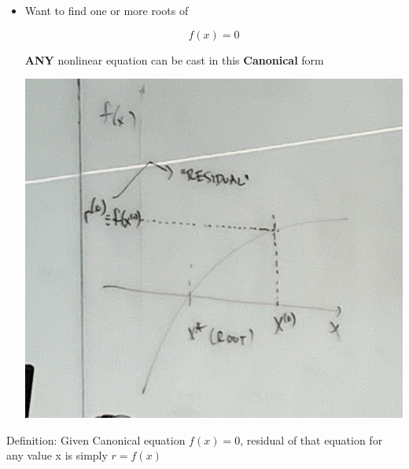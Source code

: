 \begin{itemize}
    \item Want to find one or more roots of 

    \begin{equation}
        f(x) = 0
    \end{equation}

    \textbf{ANY} nonlinear equation can be cast in this \textbf{Canonical} form

    \includegraphics[width = \linewidth]{Images/410Notes_Residual.png}
    
\end{itemize}

Definition: Given Canonical equation $f(x)=0$, residual of that equation for any value x is simply $r = f(x)$


